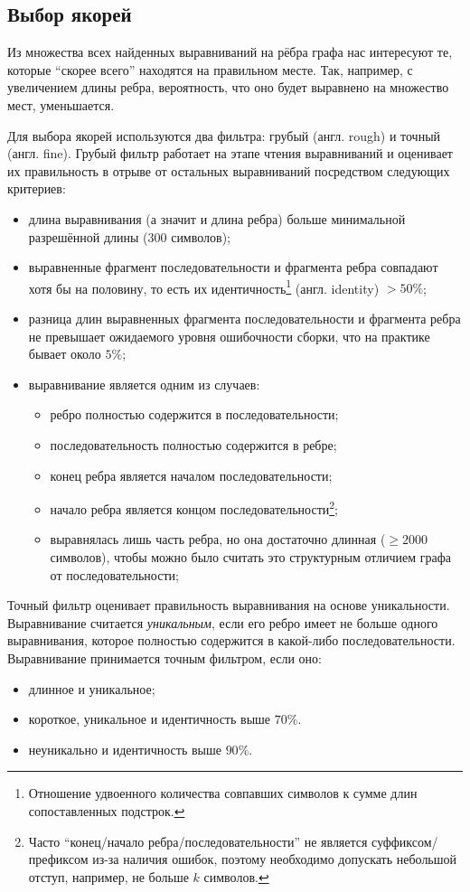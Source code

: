 \documentclass[14pt]{matmex-diploma-custom}
\begin{document}
\subsection{Выбор якорей}
Из множества всех найденных выравниваний на рёбра графа нас интересуют те, которые ``скорее всего'' находятся на правильном месте. Так, например, с увеличением длины ребра, вероятность, что оно будет выравнено на множество мест, уменьшается.

Для выбора якорей используются два фильтра: грубый (англ. rough) и точный (англ. fine). Грубый фильтр работает на этапе чтения выравниваний и оценивает их правильность в отрыве от остальных выравниваний посредством следующих критериев:
\begin{itemize}
    \item длина выравнивания (а значит и длина ребра) больше минимальной разрешённой длины ($300$ символов);
    \item выравненные фрагмент последовательности и фрагмента ребра совпадают хотя бы на половину, то есть их идентичность\footnote{Отношение удвоенного количества совпавших символов к сумме длин сопоставленных подстрок.} (англ. identity) $> 50\%$;
    \item разница длин выравненных фрагмента последовательности и фрагмента ребра не превышает ожидаемого уровня ошибочности сборки, что на практике бывает около $5\%$;
    \item выравнивание является одним из случаев:
    \begin{itemize}
        \item ребро полностью содержится в последовательности;
        \item последовательность полностью содержится в ребре;
        \item конец ребра является началом последовательности;
        \item начало ребра является концом последовательности\footnote{Часто ``конец/начало ребра/последовательности'' не является суффиксом/префиксом из-за наличия ошибок, поэтому необходимо допускать небольшой отступ, например, не больше $k$ символов.};
        \item выравнялась лишь часть ребра, но она достаточно длинная ($\ge 2000$ символов), чтобы можно было считать это структурным отличием графа от последовательности;
    \end{itemize}
\end{itemize}

Точный фильтр оценивает правильность выравнивания на основе уникальности. Выравнивание считается \textit{уникальным}, если его ребро имеет не больше одного выравнивания, которое полностью содержится в какой-либо последовательности. Выравнивание принимается точным фильтром, если оно:
\begin{itemize}
    \item длинное и уникальное;
    \item короткое, уникальное и идентичность выше $70\%$.
    \item неуникально и идентичность выше $90\%$.
\end{itemize}
\end{document}
